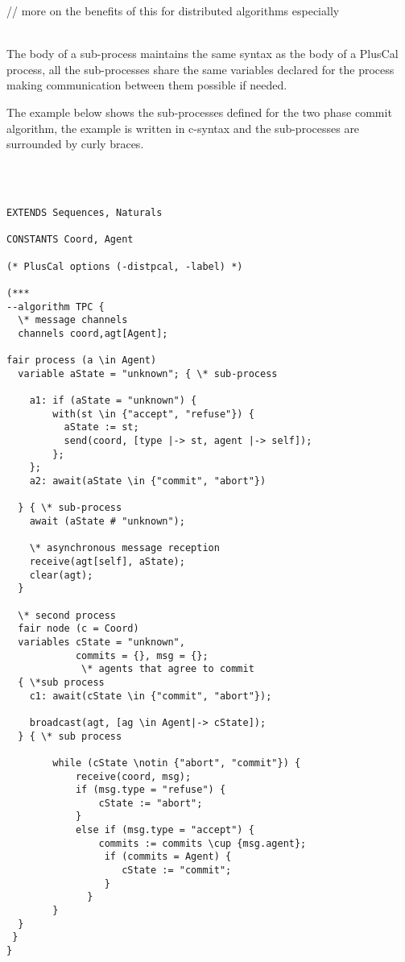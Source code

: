 \documentclass{thesul}
\begin{document}
// more on the benefits of this for distributed algorithms especially

\hfill\\
The body of a sub-process maintains the same syntax as the body of a PlusCal process, all the sub-processes share the same variables declared for the process making communication between them possible if needed.

The example below shows the sub-processes defined for the two phase commit algorithm, the example is written in c-syntax and the sub-processes are surrounded by curly braces.

\hfill\\\hfill\\
\begin{lstlisting}[caption = Distributed PlusCal Sub-Processes, frame = tlrb, firstnumber = 1]
EXTENDS Sequences, Naturals

CONSTANTS Coord, Agent

(* PlusCal options (-distpcal, -label) *)

(***
--algorithm TPC {
  \* message channels
  channels coord,agt[Agent];
  
fair process (a \in Agent)
  variable aState = "unknown"; { \* sub-process

    a1: if (aState = "unknown") {
        with(st \in {"accept", "refuse"}) {
          aState := st;
          send(coord, [type |-> st, agent |-> self]);
        };
    };
    a2: await(aState \in {"commit", "abort"})
    
  } { \* sub-process
    await (aState # "unknown");
    
    \* asynchronous message reception
    receive(agt[self], aState); 
    clear(agt);
  }

  \* second process
  fair node (c = Coord) 
  variables cState = "unknown",
            commits = {}, msg = {};
             \* agents that agree to commit
  { \*sub process
    c1: await(cState \in {"commit", "abort"});
     
    broadcast(agt, [ag \in Agent|-> cState]);
  } { \* sub process
  
        while (cState \notin {"abort", "commit"}) {
            receive(coord, msg);
            if (msg.type = "refuse") {
                cState := "abort";
            }
            else if (msg.type = "accept") {
                commits := commits \cup {msg.agent};
                 if (commits = Agent) {
                    cState := "commit";
                 }
              }
        }
  }
 }
}
\end{lstlisting}
\end{document}
